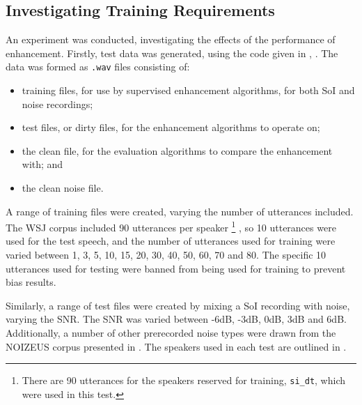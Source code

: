 \subsection{\label{sub:Investigating-Training-Req}Investigating Training Requirements}

An experiment was conducted, investigating the effects of the performance
of enhancement. Firstly, test data was generated, using the code given
in , \textit{}.
The data was formed as \lstinline[language=bash]!.wav! files consisting
of:
\begin{itemize}
\item training files, for use by supervised enhancement algorithms, for
both \ac{SoI} and noise recordings;
\item test files, or dirty files, for the enhancement algorithms to operate
on;
\item the clean file, for the evaluation algorithms to compare the enhancement
with; and
\item the clean noise file.
\end{itemize}
A range of training files were created, varying the number of utterances
included. The \ac{WSJ} corpus included 90 utterances per speaker%
\footnote{There are 90 utterances for the speakers reserved for training, \lstinline[language=bash]!si_dt!,
which were used in this test.%
} \citep{Fransen1994}, so 10 utterances were used for the test speech,
and the number of utterances used for training were varied between
1, 3, 5, 10, 15, 20, 30, 40, 50, 60, 70 and 80. The specific 10 utterances
used for testing were banned from being used for training to prevent
bias results.

Similarly, a range of test files were created by mixing a \ac{SoI}
recording with noise, varying the \ac{SNR}. The \ac{SNR} was varied
between -6dB, -3dB, 0dB, 3dB and 6dB. Additionally, a number of other
prerecorded noise types were drawn from the NOIZEUS corpus presented
in \citep{Hu2006}. The speakers used in each test are outlined in
.

